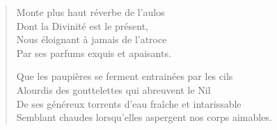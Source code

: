 \begin{verse}
  Monte plus haut réverbe de l’aulos\\  %
  Dont la Divinité est le présent,\\  %
  Nous éloignant à jamais de l’atroce\\  %
  Par ses parfums exquis et apaisants.

  Que les paupières se ferment entrainées par les cils\\  %
  Alourdis des gouttelettes qui abreuvent le Nil\\  %
  De ses généreux torrents d’eau fraîche et intarissable\\  %
  Semblant chaudes lorsqu’elles aspergent nos corps aimables.
\end{verse}


\newpage
\thispagestyle{empty}
\null\cleardoublepage

